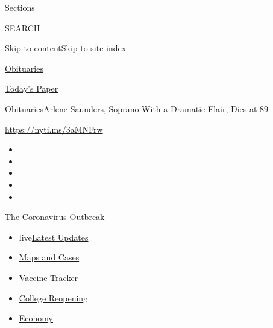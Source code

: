 Sections

SEARCH

\protect\hyperlink{site-content}{Skip to
content}\protect\hyperlink{site-index}{Skip to site index}

\href{https://www.nytimes.com/section/obituaries}{Obituaries}

\href{https://myaccount.nytimes.com/auth/login?response_type=cookie\&client_id=vi}{}

\href{https://www.nytimes.com/section/todayspaper}{Today's Paper}

\href{/section/obituaries}{Obituaries}\textbar{}Arlene Saunders, Soprano
With a Dramatic Flair, Dies at 89

\url{https://nyti.ms/3aMNFrw}

\begin{itemize}
\item
\item
\item
\item
\item
\end{itemize}

\href{https://www.nytimes.com/news-event/coronavirus?action=click\&pgtype=Article\&state=default\&region=TOP_BANNER\&context=storylines_menu}{The
Coronavirus Outbreak}

\begin{itemize}
\tightlist
\item
  live\href{https://www.nytimes.com/2020/08/03/world/coronavirus-covid-19.html?action=click\&pgtype=Article\&state=default\&region=TOP_BANNER\&context=storylines_menu}{Latest
  Updates}
\item
  \href{https://www.nytimes.com/interactive/2020/us/coronavirus-us-cases.html?action=click\&pgtype=Article\&state=default\&region=TOP_BANNER\&context=storylines_menu}{Maps
  and Cases}
\item
  \href{https://www.nytimes.com/interactive/2020/science/coronavirus-vaccine-tracker.html?action=click\&pgtype=Article\&state=default\&region=TOP_BANNER\&context=storylines_menu}{Vaccine
  Tracker}
\item
  \href{https://www.nytimes.com/2020/08/02/us/covid-college-reopening.html?action=click\&pgtype=Article\&state=default\&region=TOP_BANNER\&context=storylines_menu}{College
  Reopening}
\item
  \href{https://www.nytimes.com/live/2020/08/03/business/stock-market-today-coronavirus?action=click\&pgtype=Article\&state=default\&region=TOP_BANNER\&context=storylines_menu}{Economy}
\end{itemize}

